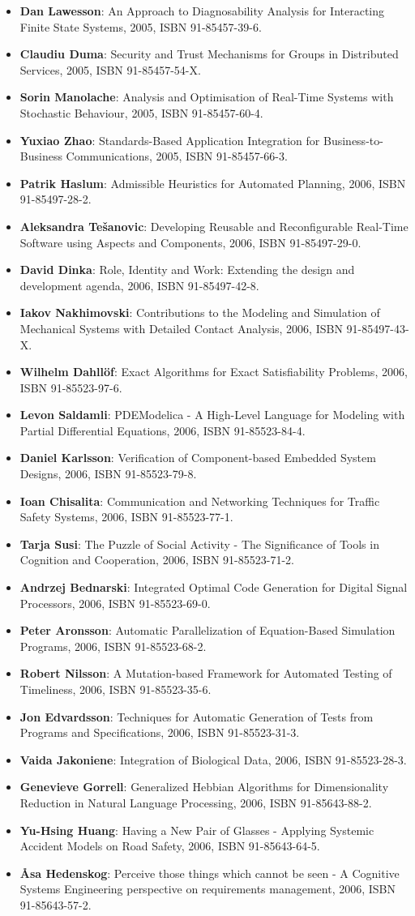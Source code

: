 \documentclass[a4paper,showtrims,twocolumn]{memoir}
\newenvironment{theses}
  {
    \begin{itemize}
      \setlength{\itemsep}{0.2em}
      \setlength{\parskip}{0em}
      \setlength{\parsep}{0em}
  }
  {
    \end{itemize}
  }
\newcommand{\thesis}[5]{\item[No. #1] \textbf{#2}: #3, #4, ISBN #5.}
\begin{document}
\begin{theses}
    \thesis{974}{Dan Lawesson}{An Approach to Diagnosability Analysis for Interacting Finite State Systems}{2005}{91-85457-39-6}
    \thesis{979}{Claudiu Duma}{Security and Trust Mechanisms for Groups in Distributed Services}{2005}{91-85457-54-X}
    \thesis{983}{Sorin Manolache}{Analysis and Optimisation of Real-Time Systems with Stochastic Behaviour}{2005}{91-85457-60-4}
    \thesis{986}{Yuxiao Zhao}{Standards-Based Application Integration for Business-to-Business Communications}{2005}{91-85457-66-3}
    \thesis{1004}{Patrik Haslum}{Admissible Heuristics for Automated Planning}{2006}{91-85497-28-2}
    \thesis{1005}{Aleksandra Tešanovic}{Developing Reusable and Reconfigurable Real-Time Software using Aspects and Components}{2006}{91-85497-29-0}
    \thesis{1008}{David Dinka}{Role, Identity and Work: Extending the design and development agenda}{2006}{91-85497-42-8}
    \thesis{1009}{Iakov Nakhimovski}{Contributions to the Modeling and Simulation of Mechanical Systems with Detailed Contact Analysis}{2006}{91-85497-43-X}
    \thesis{1013}{Wilhelm Dahllöf}{Exact Algorithms for Exact Satisfiability Problems}{2006}{91-85523-97-6}
    \thesis{1016}{Levon Saldamli}{PDEModelica - A High-Level Language for Modeling with Partial Differential Equations}{2006}{91-85523-84-4}
    \thesis{1017}{Daniel Karlsson}{Verification of Component-based Embedded System Designs}{2006}{91-85523-79-8}
    \thesis{1018}{Ioan Chisalita}{Communication and Networking Techniques for Traffic Safety Systems}{2006}{91-85523-77-1}
    \thesis{1019}{Tarja Susi}{The Puzzle of Social Activity - The Significance of Tools in Cognition and Cooperation}{2006}{91-85523-71-2}
    \thesis{1021}{Andrzej Bednarski}{Integrated Optimal Code Generation for Digital Signal Processors}{2006}{91-85523-69-0}
    \thesis{1022}{Peter Aronsson}{Automatic Parallelization of Equation-Based Simulation Programs}{2006}{91-85523-68-2}
    \thesis{1030}{Robert Nilsson}{A Mutation-based Framework for Automated Testing of Timeliness}{2006}{91-85523-35-6}
    \thesis{1034}{Jon Edvardsson}{Techniques for Automatic Generation of Tests from Programs and Specifications}{2006}{91-85523-31-3}
    \thesis{1035}{Vaida Jakoniene}{Integration of Biological Data}{2006}{91-85523-28-3}
    \thesis{1045}{Genevieve Gorrell}{Generalized Hebbian Algorithms for Dimensionality Reduction in Natural Language Processing}{2006}{91-85643-88-2}
    \thesis{1051}{Yu-Hsing Huang}{Having a New Pair of Glasses - Applying Systemic Accident Models on Road Safety}{2006}{91-85643-64-5}
    \thesis{1054}{Åsa Hedenskog}{Perceive those things which cannot be seen - A Cognitive Systems Engineering perspective on requirements management}{2006}{91-85643-57-2}

\end{theses}
\end{document}

